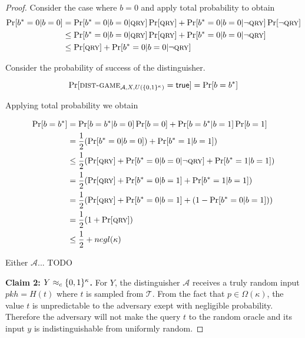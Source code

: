 \begin{proof}
  Consider the case where $b = 0$ and apply total probability to obtain
  \begin{align*}
  \Pr[b^* = 0|b = 0] &=
    \Pr[b^* = 0|b = 0|\textsc{qry}]\Pr[\textsc{qry}] +
    \Pr[b^* = 0|b = 0|\lnot \textsc{qry}]\Pr[\lnot \textsc{qry}]\\
    &\leq
    \Pr[b^* = 0|b = 0|\textsc{qry}]\Pr[\textsc{qry}] +
    \Pr[b^* = 0|b = 0|\lnot \textsc{qry}]\\
    &\leq
    \Pr[\textsc{qry}] +
    \Pr[b^* = 0|b = 0|\lnot \textsc{qry}]
  \end{align*}

  Consider the probability of success of the distinguisher.

  \[
    \Pr[\textsc{dist-game}_{\mathcal{A},X,U(\{0,1\}^\kappa)} = \mathsf{true}]
    =
    \Pr[b = b^*]
  \]

  Applying total probability we obtain

  \begin{align*}
    \Pr[b = b^*] &= \Pr[b = b^*|b = 0]\Pr[b = 0] + \Pr[b = b^*|b = 1]\Pr[b = 1]\\
                 &= \frac{1}{2}(\Pr[b^* = 0|b = 0]) + \Pr[b^* = 1|b = 1])\\
                 &\leq \frac{1}{2}(\Pr[\textsc{qry}] + \Pr[b^* = 0|b = 0|\lnot \textsc{qry}]
                 + \Pr[b^* = 1|b = 1])\\
                 &= \frac{1}{2}(\Pr[\textsc{qry}] + \Pr[b^* = 0|b = 1]
                 + \Pr[b^* = 1|b = 1])\\
                 &= \frac{1}{2}(\Pr[\textsc{qry}] + \Pr[b^* = 0|b = 1]
                 + (1 - \Pr[b^* = 0|b = 1]))\\
                 &= \frac{1}{2}(1 + \Pr[\textsc{qry}])\\
                 &\leq \frac{1}{2} + negl(\kappa)
  \end{align*}

  Either $\mathcal{A}$... TODO

  \textbf{Claim 2: $Y \approx_c \{0, 1\}^\kappa$.}
  For $Y$, the distinguisher $\mathcal{A}$ receives a truly random input $pkh = H(t)$ where $t$ is sampled from $\mathcal{T}$. From the fact that $p \in \Omega(\kappa)$, the value $t$ is unpredictable to the adversary exept with negligible probability. Therefore the adversary will not make the query $t$ to the random oracle and its input $y$ is indistinguishable from uniformly random.
\end{proof}
